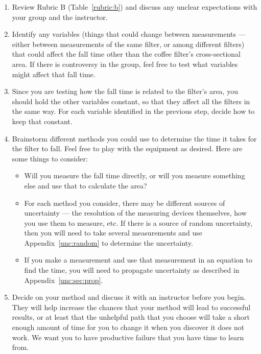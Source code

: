 \begin{enumerate}
	\item Review Rubric B (Table~\ref{rubric:b}) and discuss any unclear expectations with your group and the instructor.
	
	\item Identify any variables (things that could change between measurements --- either between measurements of the same filter, or among different filters) that could affect the fall time other than the coffee filter's cross-sectional area. If there is controversy in the group, feel free to test what variables might affect that fall time.
	
	\item Since you are testing how the fall time is related to the filter's area, you should hold the other variables constant, so that they affect all the filters in the same way. For each variable identified in the previous step, decide how to keep that constant.
	
	\item Brainstorm different methods you could use to determine the time it takes for the filter to fall. Feel free to play with the equipment as desired. Here are some things to consider:
	\begin{itemize}
		
		\item Will you measure the fall time directly, or will you measure something else and use that to calculate the area?
		
		\item For each method you consider, there may be different sources of uncertainty --- the resolution of the measuring devices themselves, how you use them to measure, etc. If there is a source of random uncertainty, then you will need to take several measurements and use Appendix~\ref{unc:random} to determine the uncertainty.
		
		\item If you make a measurement and use that measurement in an equation to find the time, you will need to propagate uncertainty as described in Appendix~\ref{unc:sec:prop}.
	\end{itemize}
		
	\item Decide on your method and discuss it with an instructor before you begin. They will help increase the chances that your method will lead to successful results, or at least that the unhelpful path that you choose will take a short enough amount of time for you to change it when you discover it does not work. We want you to have productive failure that you have time to learn from.
	

\end{enumerate}
